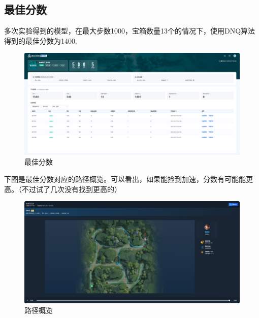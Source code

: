 \subsection{最佳分数}
多次实验得到的模型，在最大步数1000，宝箱数量13个的情况下，使用DNQ算法得到的最佳分数为1400.
\begin{figure}[H]
    \centering
    \includegraphics[width=0.8\linewidth]{pic/best-score.png}
    \caption{ 最佳分数}
    \label{map}
\end{figure}
下图是最佳分数对应的路径概览。可以看出，如果能捡到加速，分数有可能能更高。（不过试了几次没有找到更高的）
\begin{figure}[H]
    \centering
    \includegraphics[width=0.8\linewidth]{pic/best-map.png}
    \caption{ 路径概览}
    \label{map}
\end{figure}